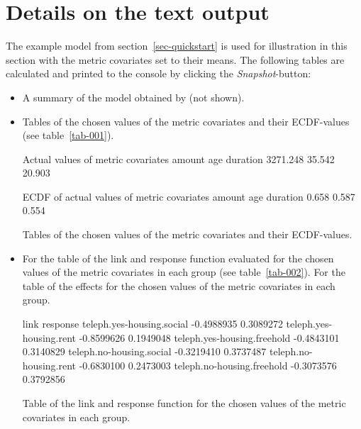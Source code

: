 \documentclass[nojss]{jss}
\begin{document}
\section{Details on the text output} \label{sec-output}
The example model from section~\ref{sec-quickstart} is used for illustration in this section with the metric covariates set to their means. The following tables are calculated and printed to the console by clicking the \emph{Snapshot}-button: 
\begin{itemize} [leftmargin=1cm, label=$\bullet$]
\item A summary of the model obtained by  (not shown).
\item Tables of the chosen values of the metric covariates and their ECDF-values (see table~\ref{tab-001}).

\begin{table}[ht]
\centering
\begin{minipage}[c]{8cm}
\begin{CodeChunk}
\small
\begin{CodeOutput}
Actual values of metric covariates
  amount      age duration 
3271.248   35.542   20.903 

ECDF of actual values of metric covariates
  amount      age duration 
   0.658    0.587    0.554
\end{CodeOutput}
\end{CodeChunk}
\end{minipage}
\caption{Tables of the chosen values of the metric covariates and their ECDF-values.} \label{tab-001}
\end{table}

\item For  the table of the link and response function evaluated for the chosen values of the metric covariates in each group (see table~\ref{tab-002}). For  the table of the effects for the chosen values of the metric covariates in each group.

\begin{table}[ht]
\centering
\begin{minipage}[c]{9cm}
\begin{CodeChunk}
\small
\begin{CodeOutput}
                                  link  response
teleph.yes-housing.social   -0.4988935 0.3089272
teleph.yes-housing.rent     -0.8599626 0.1949048
teleph.yes-housing.freehold -0.4843101 0.3140829
teleph.no-housing.social    -0.3219410 0.3737487
teleph.no-housing.rent      -0.6830100 0.2473003
teleph.no-housing.freehold  -0.3073576 0.3792856 
\end{CodeOutput}
\end{CodeChunk}
\end{minipage}
\caption{Table of the link and response function for the chosen values of the metric covariates in each group.} \label{tab-002}
\end{table}


\end{itemize}
\end{document}
